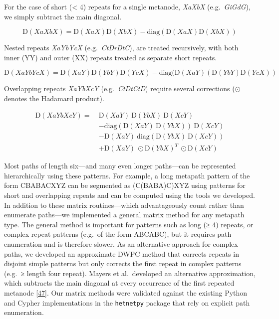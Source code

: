 For the case of short (\textless{} 4) repeats for a single metanode, \emph{XaXbX} (e.g.~\emph{GiGdG}), we simply subtract the main diagonal.

\[\mathrm{D}(\mathit{XaXbX}) = \mathrm{D}(\mathit{XaX}) \mathrm{D}(\mathit{XbX}) - \mathrm{diag}(\mathrm{D}(\mathit{XaX}) \mathrm{D}(\mathit{XbX}))\]

Nested repeats \emph{XaYbYcX} (e.g.~\emph{CtDrDtC}), are treated recursively, with both inner (YY) and outer (XX) repeats treated as separate short repeats.

\[
\mathrm{D}(\mathit{XaYbYcX}) = \mathrm{D}(\mathit{XaY}) \mathrm{D}(\mathit{YbY}) \mathrm{D}(\mathit{YcX}) - \mathrm{diag}(\mathrm{D}(\mathit{XaY}) (\mathrm{D}(\mathit{YbY}) \mathrm{D}(\mathit{YcX}))
\]

Overlapping repeats \emph{XaYbXcY} (e.g.~\emph{CtDtCtD}) require several corrections (\(\odot\) denotes the Hadamard product).

\begin{align}
\mathrm{D}(\mathit{XaYbXcY}) =\ &\mathrm{D}(\mathit{XaY})\  \mathrm{D}(\mathit{YbX})\  \mathrm{D}(\mathit{XcY}) \\
&- \mathrm{diag}(\mathrm{D}(\mathit{XaY})\  \mathrm{D}(\mathit{YbX}))\  \mathrm{D}(\mathit{XcY}) \\
&- \mathrm{D}(\mathit{XaY})\  \mathrm{diag}(\mathrm{D}(\mathit{YbX})\  \mathrm{D}(\mathit{XcY})) \\
&+ \mathrm{D}(\mathit{XaY})\  \odot \mathrm{D}(\mathit{YbX})^T\  \odot \mathrm{D}(\mathit{XcY})
\end{align}

Most paths of length six---and many even longer paths---can be represented hierarchically using these patterns.
For example, a long metapath pattern of the form CBABACXYZ can be segmented as (C(BABA)C)XYZ using patterns for short and overlapping repeats and can be computed using the tools we developed.
In addition to these matrix routines---which advantageously count rather than enumerate paths---we implemented a general matrix method for any metapath type.
The general method is important for patterns such as long (≥ 4) repeats, or complex repeat patterns (e.g.~of the form ABCABC), but it requires path enumeration and is therefore slower.
As an alternative approach for complex paths, we developed an approximate DWPC method that corrects repeats in disjoint simple patterns but only corrects the first repeat in complex patterns (e.g.~≥ length four repeat).
Mayers et al.~developed an alternative approximation, which subtracts the main diagonal at every occurrence of the first repeated metanode {[}\protect\hyperlink{ref-IJWsN67g}{47}{]}.
Our matrix methods were validated against the existing Python and Cypher implementations in the \texttt{hetnetpy} package that rely on explicit path enumeration.

